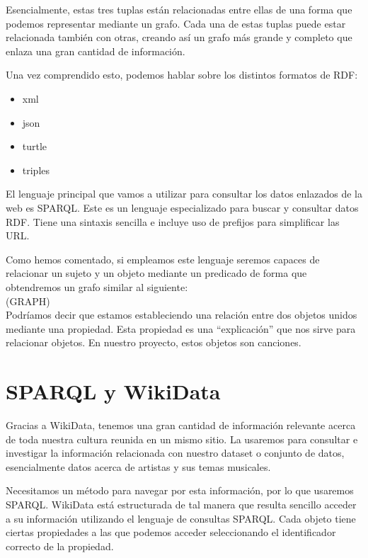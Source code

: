 Esencialmente, estas tres tuplas están relacionadas entre ellas de una forma que podemos representar mediante un grafo. Cada una de estas tuplas puede estar relacionada también con otras, creando así un grafo más grande y completo que enlaza una gran cantidad de información.

Una vez comprendido esto, podemos hablar sobre los distintos formatos de RDF:
\begin{itemize}
\item xml
\item json
\item turtle
\item triples
\end{itemize}

El lenguaje principal que vamos a utilizar para consultar los datos enlazados de la web es SPARQL. Este es un lenguaje especializado para buscar y consultar datos RDF. Tiene una sintaxis sencilla e incluye uso de prefijos para simplificar las URL.

Como hemos comentado, si empleamos este lenguaje seremos capaces de relacionar un sujeto y un objeto mediante un predicado de forma que obtendremos un grafo similar al siguiente:\\

(GRAPH)\\

Podríamos decir que estamos estableciendo una relación entre dos objetos unidos mediante una propiedad. Esta propiedad es una ``explicación'' que nos sirve para relacionar objetos. En nuestro proyecto, estos objetos son canciones.


\section{SPARQL y WikiData}

Gracias a WikiData, tenemos una gran cantidad de información relevante acerca de toda nuestra cultura reunida en un mismo sitio. La usaremos para consultar e investigar la información relacionada con nuestro dataset o conjunto de datos, esencialmente datos acerca de artistas y sus temas musicales.

Necesitamos un método para navegar por esta información, por lo que usaremos SPARQL. WikiData está estructurada de tal manera que resulta sencillo acceder a su información utilizando el lenguaje de consultas SPARQL. Cada objeto tiene ciertas propiedades a las que podemos acceder seleccionando el identificador correcto de la propiedad.

